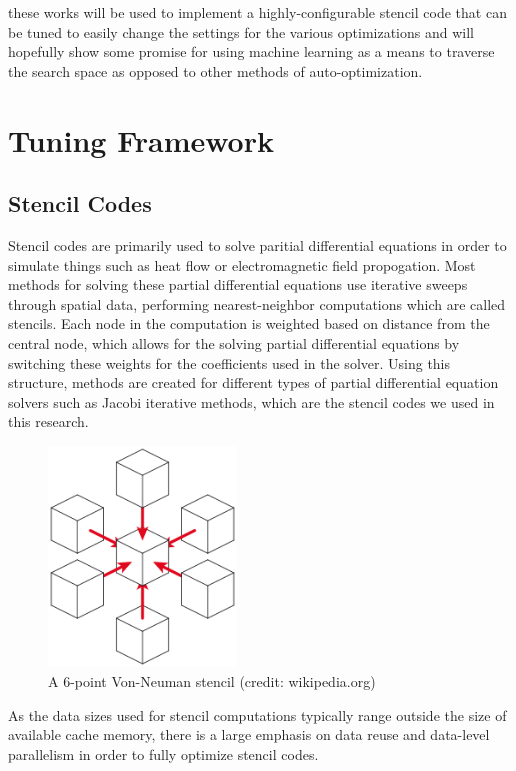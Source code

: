 \documentclass[conference]{IEEEtran}
\begin{document}
	these works will be used to implement a highly-configurable stencil code that can be tuned to easily change the settings for the various optimizations and will hopefully show some promise for using machine learning as a means to traverse the search space as opposed to other methods of auto-optimization.
	
	\section{Tuning Framework}

\subsection{Stencil Codes}
	Stencil codes are primarily used to solve paritial differential equations in order to simulate {\color{red}things} such as heat flow or electromagnetic field propogation\cite{Datta}. Most methods for solving these partial differential equations use iterative sweeps through spatial data, performing nearest-neighbor computations which are called stencils. Each node in the computation is weighted based on distance from the central node, which allows for the solving partial differential equations by switching these weights for the coefficients used in the solver. Using this structure, methods are created for different types of partial differential equation solvers such as Jacobi iterative methods, which are the stencil codes we used in this research.

\begin{figure}[h]
	\centering
	\includegraphics[width=5cm]{stencil-7.png}
	\caption{A 6-point Von-Neuman stencil (credit: wikipedia.org)}
\end{figure}
	As the data sizes used for stencil computations typically range outside the size of available cache memory, there is a large emphasis on data reuse and data-level parallelism in order to fully optimize stencil codes.
\end{document}
